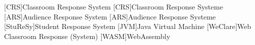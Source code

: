\begin{acronym}[StuReSy]
    [CRS]{Classroom Response System}
    [CRS]{Classroom Response Systeme}
    [ARS]{Audience Response System}
    [ARS]{Audience Response Systeme}
    [StuReSy]{Student Response System}
    [JVM]{Java Virtual Machine}
    [WeClare]{Web Classroom Response (System)}
    [WASM]{WebAssembly}
\end{acronym}
